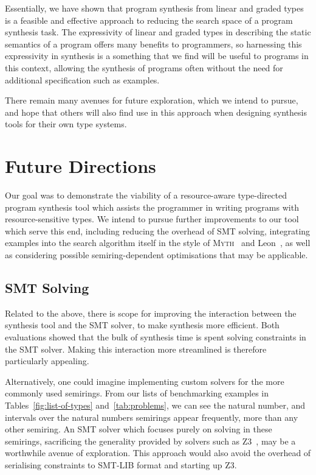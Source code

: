 Essentially, we have shown that program synthesis from linear and graded types
is a feasible and effective approach to reducing the search space of a program
synthesis task. The expressivity of linear and graded types in describing the
static semantics of a program offers many benefits to programmers, so
harnessing this expressivity in synthesis is a something that we find will be
useful to programs in this context, allowing the synthesis of programs often
without the need for additional specification such as examples.

There remain many avenues for future exploration, which we intend to pursue, and
hope that others will also find use in this approach when designing synthesis
tools for their own type systems. 

\section{Future Directions}
\label{section:future}

Our goal was to demonstrate the viability of a resource-aware type-directed
program synthesis tool which assists the programmer in writing
programs with resource-sensitive types. We intend to pursue further improvements
to our tool which serve this end, including reducing the overhead of SMT
solving, integrating examples into the search algorithm itself in the style of
\textsc{Myth}~\citep{oseraMYTH1} and Leon~\citep{10.1145/2509136.2509555}, as
well as considering possible semiring-dependent optimisations that may be
applicable.


\subsection{SMT Solving}
Related to the above, there is scope for improving the interaction between the
synthesis tool and the SMT solver, to make synthesis more efficient. Both
evaluations showed that the bulk of synthesis time is spent solving constraints
in the SMT solver. Making this interaction more streamlined is therefore
particularly appealing. 

Alternatively, one could imagine implementing custom solvers for the more
commonly used semirings. From our lists of benchmarking examples in
Tables~\ref{fig:list-of-types} and~\ref{tab:problems}, we can see the natural
number, and intervals over the natural numbers semirings appear frequently, more
than any other semiring. An SMT solver which focuses purely on solving in these
semirings, sacrificing the generality provided by solvers such as Z3~\citep{z3},
may be a worthwhile avenue of exploration. This approach would also avoid the
overhead of serialising constraints to SMT-LIB format and starting up Z3. 


